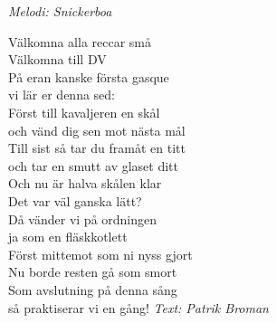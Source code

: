 {\footnotesize\textit{Melodi: Snickerboa}}\par
\vspace{10pt}
\par
Välkomna alla reccar små\\
Välkomna till DV\\
På eran kanske första gasque\\
vi lär er denna sed:\\
Först till kavaljeren en skål\\
och vänd dig sen mot nästa mål\\
Till sist så tar du framåt en titt\\
och tar en smutt av glaset ditt\\
\vspace{10pt}
Och nu är halva skålen klar\\
Det var väl ganska lätt?\\
Då vänder vi på ordningen\\
ja som en fläskkotlett\\
Först mittemot som ni nyss gjort\\
Nu borde resten gå som smort\\
Som avslutning på denna sång\\
så praktiserar vi en gång!
\vspace{10pt}
{\footnotesize\textit{Text: Patrik Broman}}
